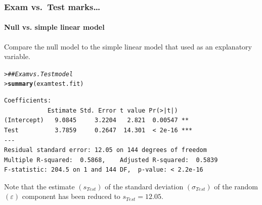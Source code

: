 \documentclass{beamer}\usepackage[]{graphicx}\usepackage[]{xcolor}
\makeatletter
\newcommand{\hlcom}[1]{\textcolor[rgb]{0.678,0.584,0.686}{\textit{#1}}}%
\newcommand{\hlstd}[1]{\textcolor[rgb]{0.345,0.345,0.345}{#1}}%
\newcommand{\hlkwd}[1]{\textcolor[rgb]{0.737,0.353,0.396}{\textbf{#1}}}%
\newenvironment{kframe}{%
 \def\at@end@of@kframe{}%
 \ifinner\ifhmode%
  \def\at@end@of@kframe{\end{minipage}}%
  \begin{minipage}{\columnwidth}%
 \fi\fi%
 \def\FrameCommand##1{\hskip\@totalleftmargin \hskip-\fboxsep
 \colorbox{shadecolor}{##1}\hskip-\fboxsep
     \hskip-\linewidth \hskip-\@totalleftmargin \hskip\columnwidth}%
 \MakeFramed {\advance\hsize-\width
   \@totalleftmargin\z@ \linewidth\hsize
   \@setminipage}}%
 {\par\unskip\endMakeFramed%
 \at@end@of@kframe}
\newenvironment{knitrout}{}{} %
\makeatother
\begin{document}
\begin{frame}[fragile]
\frametitle{Exam vs.\ Test marks\ldots}
\framesubtitle{Null vs. simple linear model}

Compare the null model to the simple linear model that
used  as an explanatory variable.
\begin{knitrout}\scriptsize
{}\color{fgcolor}\begin{kframe}
\begin{alltt}
\hlstd{> }\hlcom{## Exam vs. Test model}
\hlstd{> }\hlkwd{summary}\hlstd{(examtest.fit)}
\end{alltt}
\end{kframe}
\end{knitrout}

\begin{knitrout}\scriptsize
{}\color{fgcolor}\begin{kframe}
\begin{verbatim}
Coefficients:
            Estimate Std. Error t value Pr(>|t|)    
(Intercept)   9.0845     3.2204   2.821  0.00547 ** 
Test          3.7859     0.2647  14.301  < 2e-16 ***
---
Residual standard error: 12.05 on 144 degrees of freedom
Multiple R-squared:  0.5868,	Adjusted R-squared:  0.5839 
F-statistic: 204.5 on 1 and 144 DF,  p-value: < 2.2e-16
\end{verbatim}
\end{kframe}
\end{knitrout}

Note that the estimate $(s_{Test})$ of the standard deviation
$(\sigma_{Test})$ of the  random $(\varepsilon)$ component 
has been reduced to $s_{Test}=12.05$.

\end{frame}
\end{document}
